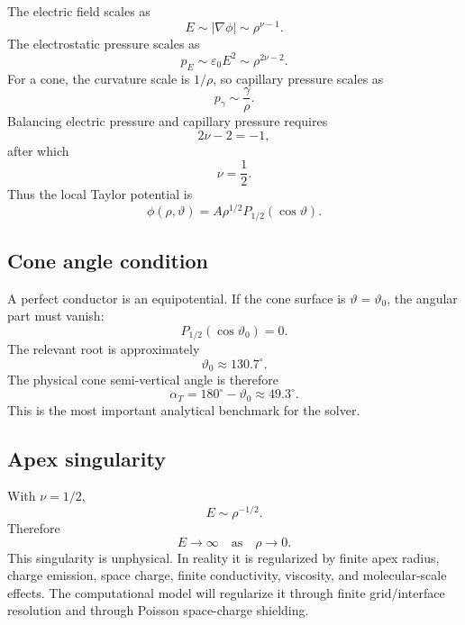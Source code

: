 \documentclass[11pt]{article}
\newcommand{\eps}{\varepsilon}
\newcommand{\grad}{\nabla}
\newcommand{\abs}[1]{\left|#1\right|}
\begin{document}
The electric field scales as
\begin{equation}
    E\sim \abs{\grad\phi}\sim \rho^{\nu-1}.
\end{equation}
The electrostatic pressure scales as
\begin{equation}
    p_E\sim \eps_0E^2\sim \rho^{2\nu-2}.
\end{equation}
For a cone, the curvature scale is \(1/\rho\), so capillary pressure scales as
\begin{equation}
    p_\gamma\sim \frac{\gamma}{\rho}.
\end{equation}
Balancing electric pressure and capillary pressure requires
\begin{equation}
    2\nu-2=-1,
\end{equation}
after which
\begin{equation}
    \nu=\frac12.
\end{equation}
Thus the local Taylor potential is
\begin{equation}
    \phi(\rho,\vartheta)=A\rho^{1/2}P_{1/2}(\cos\vartheta).
\end{equation}

\subsection{Cone angle condition}

A perfect conductor is an equipotential.  If the cone surface is \(\vartheta=\vartheta_0\), the angular part must vanish:
\begin{equation}
    P_{1/2}(\cos\vartheta_0)=0.
    \label{eq:taylor_root}
\end{equation}
The relevant root is approximately
\begin{equation}
    \vartheta_0\approx130.7^\circ.
\end{equation}
The physical cone semi-vertical angle is therefore
\begin{equation}
    \alpha_T=180^\circ-\vartheta_0\approx49.3^\circ.
\end{equation}
This is the most important analytical benchmark for the solver.

\subsection{Apex singularity}

With \(\nu=1/2\),
\begin{equation}
    E\sim\rho^{-1/2}.
\end{equation}
Therefore
\begin{equation}
    E\to\infty \quad \text{as}\quad \rho\to0.
\end{equation}
This singularity is unphysical.  In reality it is regularized by finite apex radius, charge emission, space charge, finite conductivity, viscosity, and molecular-scale effects.  The computational model will regularize it through finite grid/interface resolution and through Poisson space-charge shielding.
\end{document}
